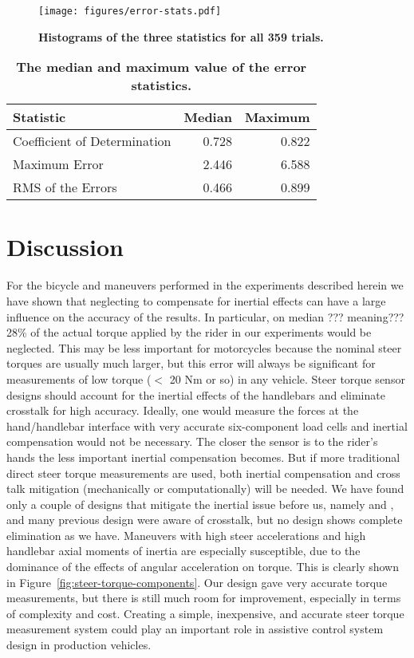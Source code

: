 \documentclass[10pt]{article}
\begin{document}
\begin{figure}
  \centering
  \texttt{[image: figures/error-stats.pdf]}
  \caption{{\bf Histograms of the three statistics for all 359 trials.}}
  \label{fig:error-stats}
\end{figure}

\begin{table}
  \caption{{\bf The median and maximum value of the error statistics.}}
  \centering
  \begin{tabular}{lrr}
    \hline
    Statistic                    & Median   & Maximum \\
    \hline
    Coefficient of Determination & 0.728 & 0.822 \\
    Maximum Error                & 2.446 & 6.588 \\
    RMS of the Errors            & 0.466 & 0.899
  \end{tabular}
  \label{tab:medians}
\end{table}

\section*{Discussion}

For the bicycle and maneuvers performed in the experiments described herein we
have shown that neglecting to compensate for inertial effects can have a large
influence on the accuracy of the results. In particular, on median ???
meaning??? 28\% of the actual torque applied by the rider in our experiments
would be neglected. This may be less important for motorcycles because the
nominal steer torques are usually much larger, but this error will always be
significant for measurements of low torque ($<$ 20 Nm or so) in any vehicle.
Steer torque sensor designs should account for the inertial effects of the
handlebars and eliminate crosstalk for high accuracy. Ideally, one would
measure the forces at the hand/handlebar interface with very accurate
six-component load cells and inertial compensation would not be necessary. The
closer the sensor is to the rider's hands the less important inertial
compensation becomes. But if more traditional direct steer torque measurements
are used, both inertial compensation and cross talk mitigation (mechanically or
computationally) will be needed. We have found only a couple of designs that
mitigate the inertial issue before us, namely \cite{Evertse2010} and
\cite{Iuchi2006}, and many previous design were aware of crosstalk, but no
design shows complete elimination as we have. Maneuvers with high steer
accelerations and high handlebar axial moments of inertia are especially
susceptible, due to the dominance of the effects of angular acceleration on
torque. This is clearly shown in Figure~\ref{fig:steer-torque-components}. Our
design gave very accurate torque measurements, but there is still much room for
improvement, especially in terms of complexity and cost. Creating a simple,
inexpensive, and accurate steer torque measurement system could play an
important role in assistive control system design in production vehicles.
\end{document}

